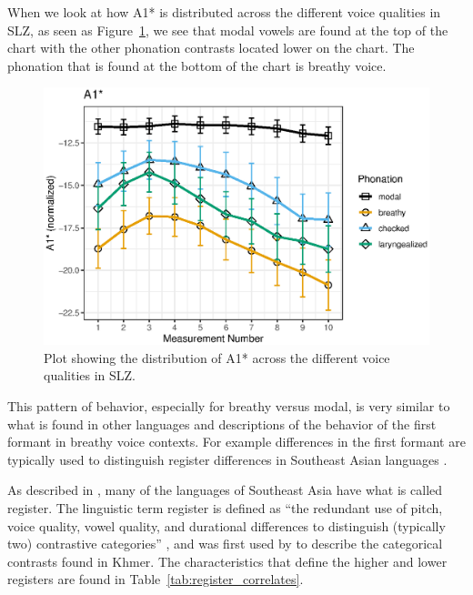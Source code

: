 When we look at how A1* is distributed across the different voice qualities in SLZ, as seen as Figure~\ref{fig:a1}, we see that modal vowels are found at the top of the chart with the other phonation contrasts located lower on the chart. The phonation that is found at the bottom of the chart is breathy voice. 
\begin{figure}[!ht]
    \centering
    \includegraphics[width = 0.9\linewidth]{images/slz_a1c.eps}
    \caption{Plot showing the distribution of A1* across the different voice qualities in SLZ.}
    \label{fig:a1}
\end{figure}

This pattern of behavior, especially for breathy versus modal, is very similar to what is found in other languages and descriptions of the behavior of the first formant in breathy voice contexts. For example differences in the first formant are typically used to distinguish register differences in Southeast Asian languages \citep{brunelleRegisterEasternCham2005,brunelleDialectExperiencePerceptual2012,brunelleTonePhonationSoutheast2016}.

As described in \citet{brunelleTonePhonationSoutheast2016}, many of the languages of Southeast Asia have what is called register. The linguistic term register is defined as ``the redundant use of pitch, voice quality, vowel quality, and durational differences to distinguish (typically two) contrastive categories'' \citep[193]{brunelleTonePhonationSoutheast2016}, and was first used by \citet{hendersonMainFeaturesCambodian1952} to describe the categorical contrasts found in Khmer. The characteristics that define the higher and lower registers are found in Table~\ref{tab:register_correlates}.

